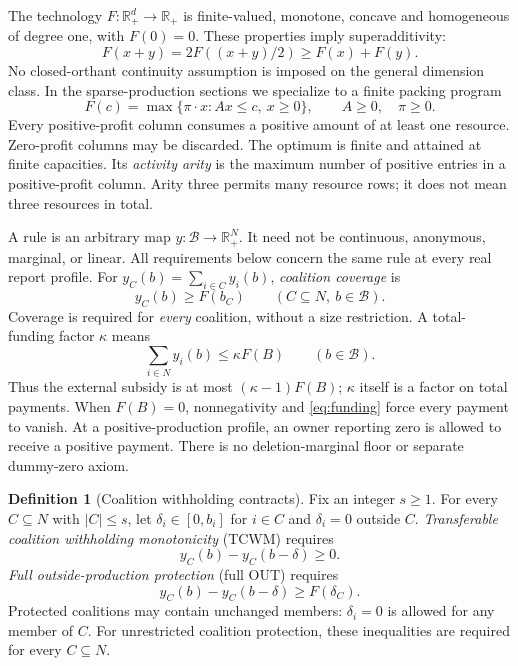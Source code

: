 \documentclass[11pt]{article}
\newcommand{\R}{\mathbb R}
\theoremstyle{definition}\newtheorem{definition}[theorem]{Definition}
\theoremstyle{remark}\newtheorem{remark}[theorem]{Remark}
\begin{document}
The technology $F:\R_+^d\to\R_+$ is finite-valued, monotone, concave and
homogeneous of degree one, with $F(0)=0$. These properties imply
superadditivity:
\begin{equation}\label{eq:superadditive}
 F(x+y)=2F((x+y)/2)\ge F(x)+F(y).
\end{equation}
No closed-orthant continuity assumption is imposed on the general dimension
class. In the sparse-production sections we specialize to a finite packing
program
\begin{equation}\label{eq:packing}
 F(c)=\max\{\pi\cdot x: Ax\le c,\ x\ge0\},\qquad A\ge0,\quad\pi\ge0.
\end{equation}
Every positive-profit column consumes a positive amount of at least one
resource. Zero-profit columns may be discarded. The optimum is finite and
attained at finite capacities. Its \emph{activity arity} is the maximum number
of positive entries in a positive-profit column. Arity three permits many
resource rows; it does not mean three resources in total.

A rule is an arbitrary map $y:\mathcal B\to\R_+^N$.
It need not be continuous, anonymous, marginal, or linear. All requirements
below concern the same rule at every real report profile. For
$y_C(b)=\sum_{i\in C}y_i(b)$, \emph{coalition coverage} is
\begin{equation}\label{eq:coverage}
 y_C(b)\ge F(b_C)\qquad(C\subseteq N,\ b\in\mathcal B).
\end{equation}
Coverage is required for \emph{every} coalition, without a size restriction.
A total-funding factor $\kappa$ means
\begin{equation}\label{eq:funding}
 \sum_{i\in N}y_i(b)\le\kappa F(B)\qquad(b\in\mathcal B).
\end{equation}
Thus the external subsidy is at most $(\kappa-1)F(B)$; $\kappa$ itself is a
factor on total payments. When $F(B)=0$, nonnegativity and
\eqref{eq:funding} force every payment to vanish. At a positive-production
profile, an owner reporting zero is allowed to receive a positive payment.
There is no deletion-marginal floor or separate dummy-zero axiom.

\begin{definition}[Coalition withholding contracts]\label{def:contracts}
Fix an integer $s\ge1$. For every $C\subseteq N$ with $|C|\le s$, let
$\delta_i\in[0,b_i]$ for $i\in C$ and $\delta_i=0$ outside $C$.
\emph{Transferable coalition withholding monotonicity} (TCWM) requires
\begin{equation}\label{eq:tcwm}
 y_C(b)-y_C(b-\delta)\ge0.
\end{equation}
\emph{Full outside-production protection} (full OUT) requires
\begin{equation}\label{eq:out}
 y_C(b)-y_C(b-\delta)\ge F(\delta_C).
\end{equation}
Protected coalitions may contain unchanged members: $\delta_i=0$ is allowed
for any member of $C$. For unrestricted coalition protection, these
inequalities are required for every $C\subseteq N$.
\end{definition}
\end{document}
